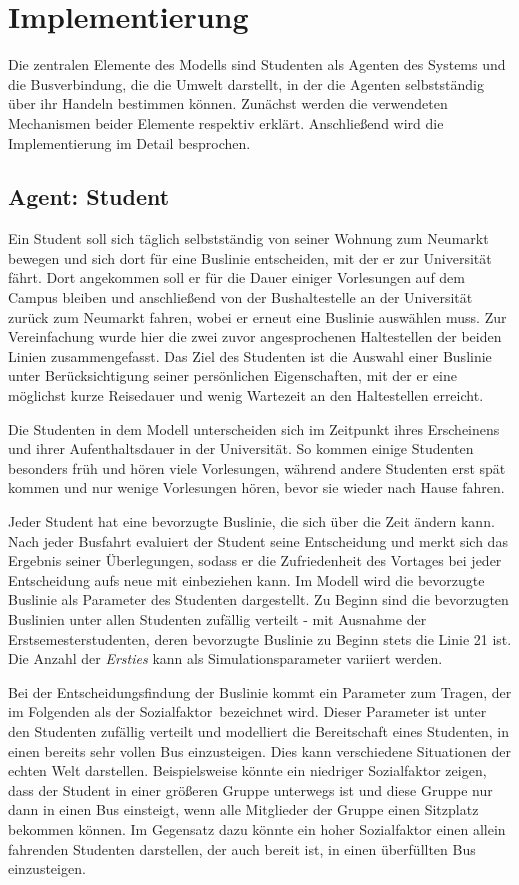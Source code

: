 \documentclass[12pt,a4paper]{scrartcl}
\begin{document}
\section{Implementierung}\label{impl}
Die zentralen Elemente des Modells sind Studenten als Agenten des Systems und die Busverbindung, die die Umwelt darstellt, in der die Agenten selbstständig über ihr Handeln bestimmen können. Zunächst werden die verwendeten Mechanismen beider Elemente respektiv erklärt. Anschließend wird die Implementierung im Detail besprochen.

\subsection{Agent: Student}\label{agent}
Ein Student soll sich täglich selbstständig von seiner Wohnung zum Neumarkt bewegen und sich dort für eine Buslinie entscheiden, mit der er zur Universität fährt. Dort angekommen soll er für die Dauer einiger Vorlesungen auf dem Campus bleiben und anschließend von der Bushaltestelle an der Universität zurück zum Neumarkt fahren, wobei er erneut eine Buslinie auswählen muss. Zur Vereinfachung wurde hier die zwei zuvor angesprochenen Haltestellen der beiden Linien zusammengefasst. 
Das Ziel des Studenten ist die Auswahl einer Buslinie unter Berücksichtigung seiner persönlichen Eigenschaften, mit der er eine möglichst kurze Reisedauer und wenig Wartezeit an den Haltestellen erreicht.

Die Studenten in dem Modell unterscheiden sich im Zeitpunkt ihres Erscheinens und ihrer Aufenthaltsdauer in der Universität. So kommen einige Studenten besonders früh und hören viele Vorlesungen, während andere Studenten erst spät kommen und nur wenige Vorlesungen hören, bevor sie wieder nach Hause fahren.

Jeder Student hat eine bevorzugte Buslinie, die sich über die Zeit ändern kann. Nach jeder Busfahrt evaluiert der Student seine Entscheidung und merkt sich das Ergebnis seiner Überlegungen, sodass er die Zufriedenheit des Vortages bei jeder Entscheidung aufs neue mit einbeziehen kann. Im Modell wird die bevorzugte Buslinie als Parameter des Studenten dargestellt. Zu Beginn sind die bevorzugten Buslinien unter allen Studenten zufällig verteilt - mit Ausnahme der Erstsemesterstudenten, deren bevorzugte Buslinie zu Beginn stets die Linie 21 ist. Die Anzahl der \textit{Ersties} kann als Simulationsparameter variiert werden.

Bei der Entscheidungsfindung der Buslinie kommt ein Parameter zum Tragen, der im Folgenden als der \glqq Sozialfaktor\grqq~bezeichnet wird. Dieser Parameter ist unter den Studenten zufällig verteilt und modelliert die Bereitschaft eines Studenten, in einen bereits sehr vollen Bus einzusteigen. Dies kann verschiedene Situationen der echten Welt darstellen. Beispielsweise könnte ein niedriger Sozialfaktor zeigen, dass der Student in einer größeren Gruppe unterwegs ist und diese Gruppe nur dann in einen Bus einsteigt, wenn alle Mitglieder der Gruppe einen Sitzplatz bekommen können. Im Gegensatz dazu könnte ein hoher Sozialfaktor  einen allein fahrenden Studenten darstellen, der auch bereit ist, in einen überfüllten Bus einzusteigen.
\end{document}
